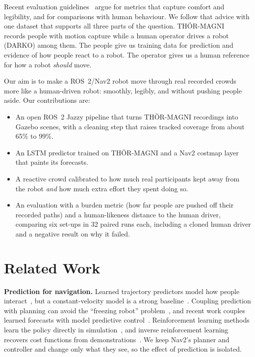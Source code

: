 \documentclass[conference]{IEEEtran}
\begin{document}
Recent evaluation guidelines~\cite{francis2023principles} argue for metrics that capture comfort and legibility, and for comparisons with human behaviour. We follow that advice with one dataset that supports all three parts of the question. TH\"OR-MAGNI~\cite{schreiter2024thor} records people with motion capture while a human operator drives a robot (DARKO) among them. The people give us training data for prediction and evidence of how people react to a robot. The operator gives us a human reference for how a robot \emph{should} move.

Our aim is to make a ROS~2/Nav2 robot move through real recorded crowds more like a human-driven robot: smoothly, legibly, and without pushing people aside. Our contributions are:
\begin{itemize}
\item An open ROS~2 Jazzy pipeline that turns TH\"OR-MAGNI recordings into Gazebo scenes, with a cleaning step that raises tracked coverage from about 65\% to 99\%.
\item An LSTM predictor trained on TH\"OR-MAGNI and a Nav2 costmap layer that paints its forecasts.
\item A reactive crowd calibrated to how much real participants kept away from the robot \emph{and} how much extra effort they spent doing so.
\item An evaluation with a burden metric (how far people are pushed off their recorded paths) and a human-likeness distance to the human driver, comparing six set-ups in 32 paired runs each, including a cloned human driver and a negative result on why it failed.
\end{itemize}

\section{Related Work}
\textbf{Prediction for navigation.} Learned trajectory predictors model how people interact~\cite{alahi2016social,rudenko2020survey}, but a constant-velocity model is a strong baseline~\cite{scholler2020cv}. Coupling prediction with planning can avoid the ``freezing robot'' problem~\cite{trautman2010unfreezing}, and recent work couples learned forecasts with model predictive control~\cite{samavi2023sicnav}. Reinforcement learning methods learn the policy directly in simulation~\cite{chen2019crowd}, and inverse reinforcement learning recovers cost functions from demonstrations~\cite{kretzschmar2016irl}. We keep Nav2's planner and controller and change only what they see, so the effect of prediction is isolated.
\end{document}
